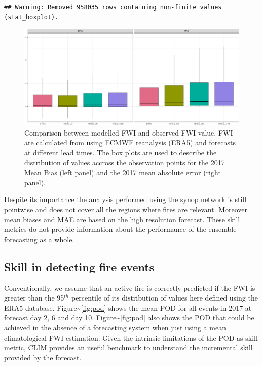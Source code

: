 \documentclass[, manuscript]{copernicus}
\begin{document}
\begin{verbatim}
## Warning: Removed 958035 rows containing non-finite values (stat_boxplot).
\end{verbatim}

\begin{figure}
\includegraphics[width=1\linewidth]{article_files/figure-latex/Figure3-1} \caption{\label{fig:Figure3}Comparison between modelled FWI and observed FWI value. FWI are calculated from using ECMWF reanalysis (ERA5) and forecasts at different lead times. The box plots are used to describe the distribution of values accross the observation points for the 2017 Mean Bias (left panel) and the 2017 mean absolute error (right panel).}\label{fig:Figure3}
\end{figure}

Despite its importance the analysis performed using the synop network is
still pointwise and does not cover all the regions where fires are
relevant. Moreover mean biases and MAE are based on the high resolution
forecast. These skill metrics do not provide information about the
performance of the ensemble forecasting as a whole.

\subsection{ Skill in detecting fire events}

Conventionally, we assume that an active fire is correctly predicted if
the FWI is greater than the 95\(^{th}\) percentile of its distribution
of values here defined using the ERA5 database.
Figure\textasciitilde{}\ref{fig:pod} shows the mean POD for all events
in 2017 at forecast day 2, 6 and day 10.
Figure\textasciitilde{}\ref{fig:pod} also shows the POD that could be
achieved in the absence of a forecasting system when just using a mean
climatological FWI estimation. Given the intrinsic limitations of the
POD as skill metric, CLIM provides an useful benchmark to understand the
incremental skill provided by the forecast.
\end{document}

